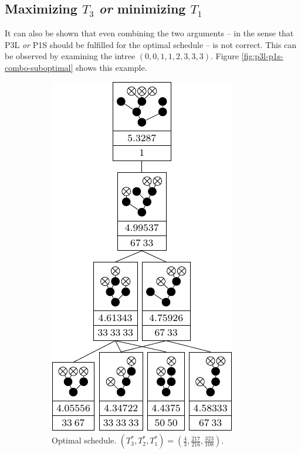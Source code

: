\subsection{Maximizing $T_3$ \emph{or} minimizing $T_1$}
\label{sec:p3-suboptimality-maximizing-t3-and-minimizing-t1}

It can also be shown that even combining the two arguments -- in the sense that P3L \emph{or} P1S should be fulfilled for the optimal schedule -- is not correct. This can be observed by examining the intree $(0, 0, 1, 1, 2, 3, 3, 3)$. Figure \ref{fig:p3l-p1s-combo-suboptimal} shows this example.

\begin{figure}[ht]
  \centering
  \begin{subfigure}{.3\linewidth}
    \centering
    \includegraphics{p3/max_p3_min_p1/00112333opt.pdf}
    \caption{Optimal schedule. $(T_3^*,T_2^*,T_1^*)=(\frac{4}{3},\frac{217}{216},\frac{323}{108})$.}
  \end{subfigure}
  \quad
  \begin{subfigure}{.3\linewidth}
    \centering

\end{subfigure}
\end{figure}

